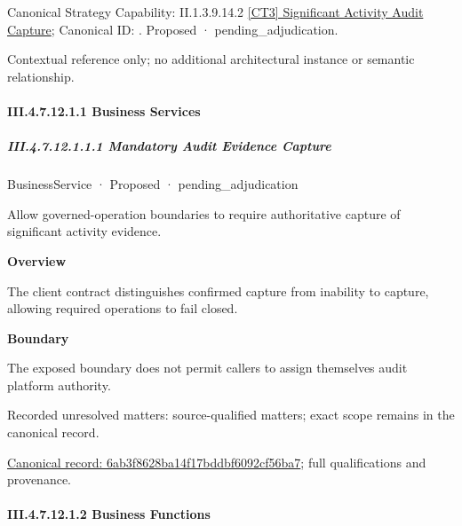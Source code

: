 {\small Canonical Strategy Capability: II.1.3.9.14.2 \hyperref[element:d903948169eb4785b0f03d916c842a8a]{[CT3] Significant Activity Audit Capture}; Canonical ID: \texttt{}. Proposed · pending\_adjudication.}\par
Contextual reference only; no additional architectural instance or semantic relationship.\par
\paragraph*{III.4.7.12.1.1 Business Services}
\label{navigation:III.4.7.12.1.1}

\subparagraph*{III.4.7.12.1.1.1 Mandatory Audit Evidence Capture}
\label{navigation:III.4.7.12.1.1.1}

\label{element:6ab3f8628ba14f17bddbf6092cf56ba7}
{\small BusinessService · Proposed · pending\_adjudication}\par

Allow governed-operation boundaries to require authoritative capture of significant activity evidence.



\textbf{Overview}



The client contract distinguishes confirmed capture from inability to capture, allowing required operations to fail closed.



\textbf{Boundary}



The exposed boundary does not permit callers to assign themselves audit platform authority.


{\small Recorded unresolved matters: source-qualified matters; exact scope remains in the canonical record.}\par
{\footnotesize \href{../../../../continuum/business/business-service/6ab3f8628ba14f17bddbf6092cf56ba7.md}{Canonical record: 6ab3f8628ba14f17bddbf6092cf56ba7}; full qualifications and provenance.}\par
\paragraph*{III.4.7.12.1.2 Business Functions}
\label{navigation:III.4.7.12.1.2}


